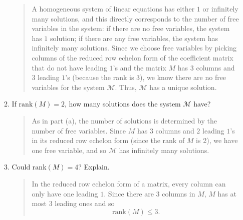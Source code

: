 \documentclass[letter]{article}
\newcommand{\Rank}{\mathrm{rank}}
\begin{document}
\begin{enumerate}
\begin{enumerate}
\begin{quote}
						A homogeneous system of linear equations has either $1$ or infinitely
						many solutions, and this directly corresponds to the number of 
						free variables in the system: if there are no free variables, the system has
						$1$ solution; if there are any free variables, the system has infinitely
						many solutions.  Since we choose free variables by picking columns
						of the reduced row echelon form of the coefficient matrix that do
						not have leading $1$'s and the matrix $M$ has $3$ columns and $3$ leading
						$1$'s (because the rank is $3$), we know there are no free variables for
						the system $\mathcal M$.  Thus, $\mathcal M$ has a unique solution.
					\end{quote}
				\item If $\Rank(M)=2$, how many solutions does the system $\mathcal M$ have?
					\begin{quote}
						As in part (a), the number of solutions is determined by the
						number of free variables.  Since $M$ has $3$ columns and $2$ leading
						$1$'s in its reduced row echelon form (since the rank of $M$ is 2), we have one free variable, and
						so $\mathcal M$ has infinitely many solutions.
					\end{quote}
				\item Could $\Rank(M)=4$? Explain.
					\begin{quote}
						In the reduced row echelon form of a matrix, every column can only have
						one leading $1$.  Since there are $3$ columns in $M$, $M$ has at most
						$3$ leading ones and so \[\Rank(M)\leq 3.\]
					\end{quote}
			\end{enumerate}
		

\end{enumerate}
\end{document}
